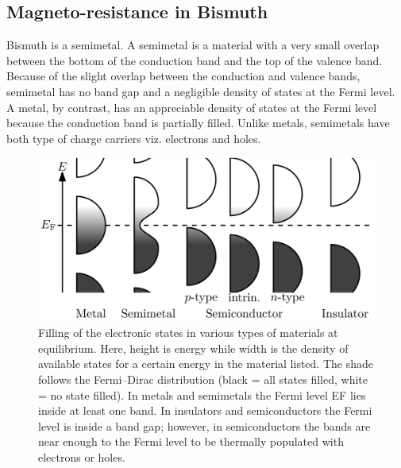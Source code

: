 \documentclass[%
 aip,
 amsmath,amssymb,
 reprint,%
]{revtex4-1}
\begin{document}
    \subsection{Magneto-resistance in Bismuth}
    Bismuth is a semimetal. A semimetal is a material with a very small overlap between
    the bottom of the conduction band and the top of the valence band. Because of the slight overlap
    between the conduction and valence bands, semimetal has no band gap and a negligible density
    of states at the Fermi level. A metal, by contrast, has an appreciable density of states at the
    Fermi level because the conduction band is partially filled. Unlike metals, semimetals have
    both type of charge carriers viz. electrons and holes.
    \begin{figure}
        \centering
        \includegraphics[scale = 0.08]{Figures/bi-magneto.png}
        \caption{Filling of the electronic states in various types of materials at equilibrium. Here, height is energy while width is the density of available states for a certain energy in the material listed. The shade follows the Fermi–Dirac distribution (black = all states filled, white = no state filled). In metals and semimetals the Fermi level EF lies inside at least one band. In insulators and semiconductors the Fermi level is inside a band gap; however, in semiconductors the bands are near enough to the Fermi level to be thermally populated with electrons or holes.}
        \label{fig:bimagneto}
    \end{figure}
    
\end{document}
